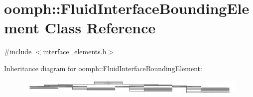 \hypertarget{classoomph_1_1FluidInterfaceBoundingElement}{}\section{oomph\+:\+:Fluid\+Interface\+Bounding\+Element Class Reference}
\label{classoomph_1_1FluidInterfaceBoundingElement}


{\ttfamily \#include $<$interface\+\_\+elements.\+h$>$}

Inheritance diagram for oomph\+:\+:Fluid\+Interface\+Bounding\+Element\+:\begin{figure}[H]
\begin{center}
\leavevmode
\includegraphics[height=0.749415cm]{classoomph_1_1FluidInterfaceBoundingElement}
\end{center}
\end{figure}

